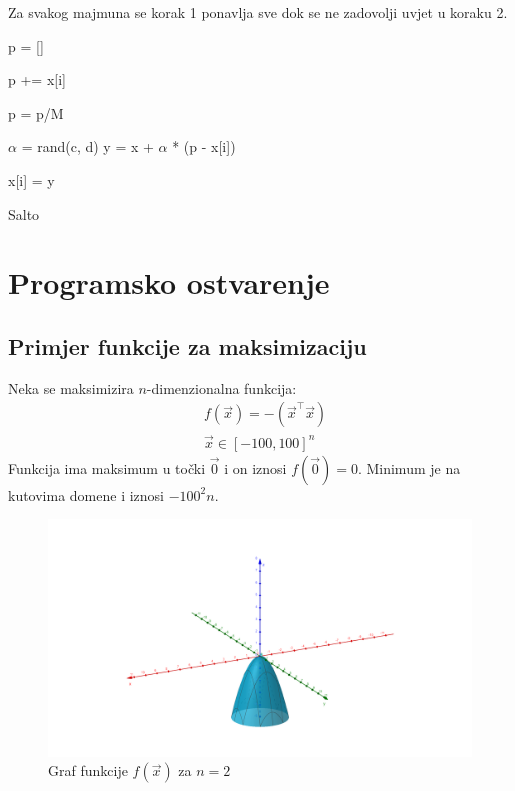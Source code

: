 Za svakog majmuna se korak 1 ponavlja sve dok se ne zadovolji uvjet u koraku 2.

\begin{algorithm}[H]
	\begin{algorithmic}[1]
		
		\State p = []
		
		\State p += x[i]
		\EndFor
		
		\State p = p/M
		
		\Repeat
		\State $\alpha$ = rand(c, d)
		\State y = x + $\alpha$ * (p - x[i])
		
		\State x[i] = y
		\EndFor
		\EndFunction
	\end{algorithmic}
	\caption{Salto}
\end{algorithm}



\section{Programsko ostvarenje}
\subsection{Primjer funkcije za maksimizaciju}
Neka se maksimizira $n$-dimenzionalna funkcija:
\begin{align*}
	&f(\vec{x}) = -(\vec{x}^\intercal\vec{x}) \label{eq:fx} \tag{4.4} \\
	&\vec{x} \in [-100, 100]^n
\end{align*}
Funkcija ima maksimum u točki $\vec{0}$ i on iznosi $f(\vec{0}) = 0$. Minimum je na kutovima domene i iznosi $-100^2n$.

\begin{figure}[H]
	\centering
	\includegraphics[width=14cm]{geogebra}
	\caption{Graf funkcije $f(\vec{x})$ za $n = 2$} 
	
\end{figure}

